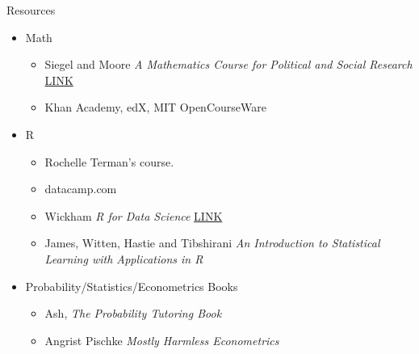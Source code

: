 \documentclass[aspectratio=169, handout]{beamer}
\numberwithin{equation}{section}
\begin{document}
\begin{frame}{Resources}

\begin{itemize}
\item Math
\begin{itemize}
\item Siegel and Moore \emph{A Mathematics Course for Political and Social Research} \href{http://people.duke.edu/~das76/Mathematics\%20for\%20Political\%20and\%20Social\%20Research\%20Syllabus\_Siegel.pdf}{LINK}
\item Khan Academy, edX, MIT OpenCourseWare
\end{itemize}
\item R
\begin{itemize}
\item Rochelle Terman's course.
\item datacamp.com
\item Wickham \emph{R for Data Science} \href{http://r4ds.had.co.nz}{LINK}
\item James, Witten, Hastie and Tibshirani \emph{An Introduction to Statistical Learning with Applications in R}
\end{itemize}
\item Probability/Statistics/Econometrics Books
\begin{itemize}
\item Ash, \emph{The Probability Tutoring Book}
\item Angrist  Pischke \emph{Mostly Harmless Econometrics}
\end{itemize}
\end{itemize}

\end{frame}
\end{document}
